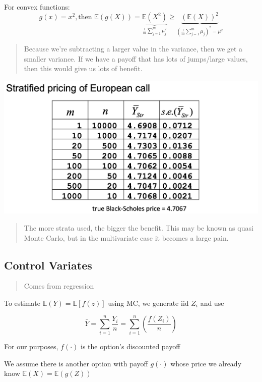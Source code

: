 \documentclass[
  oneside]{book}
\begin{document}
For convex functions:
\[
g(x) = x^{2}, \text{then } \mathbb{E}(g(X)) = \underbrace{ \mathbb{E}(X^{2}) }_{ \frac{1}{m}\sum^{m}_{j=1}\mu_{j}^{2} } \geq \underbrace{ \left( \mathbb{E}(X) \right)^{2} }_{ \left( \frac{1}{m}\sum^{m}_{j=1}\mu_{j} \right)^{2} = \mu^{2} }
\]

\begin{quote}
Because we're subtracting a larger value in the variance, then we get a smaller variance. If we have a payoff that has lots of jumps/large values, then this would give us lots of benefit.
\end{quote}

\includegraphics{Notes/Obsidian-Attachments/12-Simulation-Variance-Reduction-1.png}

\begin{quote}
The more strata used, the bigger the benefit. This may be known as quasi Monte Carlo, but in the multivariate case it becomes a large pain.
\end{quote}

\hypertarget{control-variates}{%
\subsection{Control Variates}\label{control-variates}}

\begin{quote}
Comes from regression
\end{quote}

To estimate \(\mathbb{E}(Y) = \mathbb{E}[f(z)]\) using MC, we generate iid \(Z_{i}\) and use

\[
\bar{Y} = \sum^{n}_{i=1} \frac{Y_{i}}{n} = \sum^{n}_{i=1} \left( \frac{f(Z_{i})}{n} \right)
\]

For our purposes, \(f(\cdot)\) is the option's discounted payoff

We assume there is another option with payoff \(g(\cdot)\) whose price we already know
\(\mathbb{E}(X) = \mathbb{E}(g(Z))\)
\end{document}
